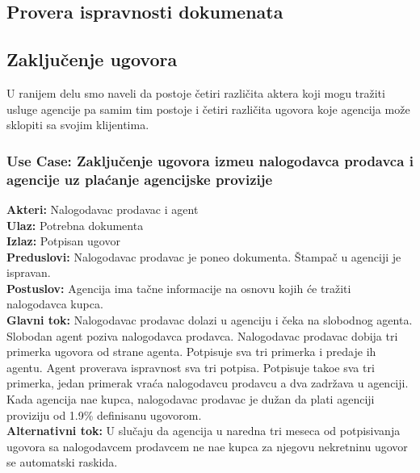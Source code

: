 \documentclass{article}
\begin{document}
\newpage
\subsection{\bfseries Provera ispravnosti dokumenata}

\newpage
\subsection{\bfseries Zaklju\v {c}enje ugovora}
\indent U ranijem delu smo naveli da postoje \v {c}etiri razli\v {c}ita aktera koji mogu tra\v {z}iti usluge agencije pa samim tim postoje i \v {c}etiri razli\v {c}ita ugovora koje agencija mo\v {z}e sklopiti sa svojim klijentima. \\ 
\subsubsection{\bfseries Use Case: Zaklju\v {c}enje ugovora izme\dj u nalogodavca prodavca i agencije uz pla\' canje agencijske provizije}

{\bfseries Akteri:} Nalogodavac prodavac i agent\\
{\bfseries Ulaz:} Potrebna dokumenta\\
{\bfseries Izlaz:} Potpisan ugovor\\
{\bfseries Preduslovi:} Nalogodavac prodavac je poneo dokumenta. \v {S}tampa\v {c} u agenciji je ispravan. \\
{\bfseries Postuslov:} Agencija ima ta\v {c}ne informacije na osnovu kojih \' ce tra\v {z}iti nalogodavca kupca. \\
{\bfseries Glavni tok:} Nalogodavac prodavac dolazi u agenciju i \v {c}eka na slobodnog agenta. Slobodan agent poziva nalogodavca prodavca. Nalogodavac prodavac dobija tri primerka ugovora od strane agenta. Potpisuje sva tri primerka i predaje ih agentu. Agent proverava ispravnost sva tri potpisa. Potpisuje tako\dj e sva tri primerka, jedan primerak vra\' ca nalogodavcu prodavcu a dva zadr\v {z}ava u agenciji. Kada agencija na\dj e kupca, nalogodavac prodavac je du\v {z}an da plati agenciji proviziju od 1.9\% definisanu ugovorom. \\
{\bfseries Alternativni tok:} U slu\v {c}aju da agencija u naredna tri meseca od potpisivanja ugovora sa nalogodavcem prodavcem ne na\dj e kupca za njegovu nekretninu ugovor se automatski raskida. \\
\end{document}
